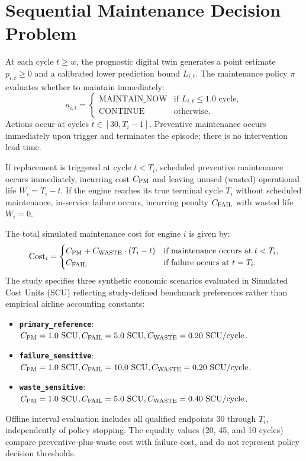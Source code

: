 \section{Sequential Maintenance Decision Problem}
At each cycle $t \ge w$, the prognostic digital twin generates a point estimate $p_{i,t} \ge 0$ and a calibrated lower prediction bound $L_{i,t}$. The maintenance policy $\pi$ evaluates whether to maintain immediately:
\begin{equation}
a_{i,t} = \begin{cases} 
\text{MAINTAIN\_NOW} & \text{if } L_{i,t} \le 1.0\text{ cycle}, \\
\text{CONTINUE} & \text{otherwise},
\end{cases}
\end{equation}
Actions occur at cycles $t \in [30, T_i - 1]$. Preventive maintenance occurs immediately upon trigger and terminates the episode; there is no intervention lead time.

If replacement is triggered at cycle $t < T_i$, scheduled preventive maintenance occurs immediately, incurring cost $C_{\text{PM}}$ and leaving unused (wasted) operational life $W_i = T_i - t$. If the engine reaches its true terminal cycle $T_i$ without scheduled maintenance, in-service failure occurs, incurring penalty $C_{\text{FAIL}}$ with wasted life $W_i = 0$.

The total simulated maintenance cost for engine $i$ is given by:
\begin{equation}
\text{Cost}_i = \begin{cases}
C_{\text{PM}} + C_{\text{WASTE}} \cdot (T_i - t) & \text{if maintenance occurs at } t < T_i, \\
C_{\text{FAIL}} & \text{if failure occurs at } t = T_i.
\end{cases}
\end{equation}
The study specifies three synthetic economic scenarios evaluated in Simulated Cost Units (SCU) reflecting study-defined benchmark preferences rather than empirical airline accounting constants:
\begin{itemize}
  \item \textbf{\texttt{primary\_reference}}: $C_{\text{PM}} = 1.0~\text{SCU}, C_{\text{FAIL}} = 5.0~\text{SCU}, C_{\text{WASTE}} = 0.20~\text{SCU}/\text{cycle}$.
  \item \textbf{\texttt{failure\_sensitive}}: $C_{\text{PM}} = 1.0~\text{SCU}, C_{\text{FAIL}} = 10.0~\text{SCU}, C_{\text{WASTE}} = 0.20~\text{SCU}/\text{cycle}$.
  \item \textbf{\texttt{waste\_sensitive}}: $C_{\text{PM}} = 1.0~\text{SCU}, C_{\text{FAIL}} = 5.0~\text{SCU}, C_{\text{WASTE}} = 0.40~\text{SCU}/\text{cycle}$.
\end{itemize}
Offline interval evaluation includes all qualified endpoints $30$ through $T_i$, independently of policy stopping. The equality values (20, 45, and 10 cycles) compare preventive-plus-waste cost with failure cost, and do not represent policy decision thresholds.

